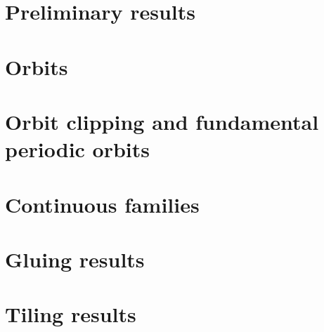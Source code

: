 \section{Preliminary results}

\section{Orbits}

\section{Orbit clipping and fundamental periodic orbits}

\section{Continuous families}

\section{Gluing results}

\section{Tiling results}
 